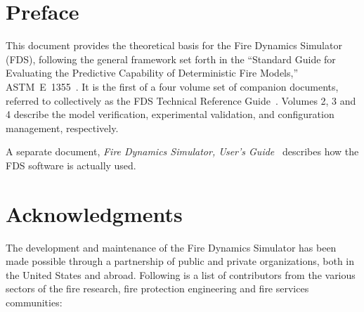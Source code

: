 \documentclass[11pt]{book}
\begin{document}
\newpage





\newpage

\frontmatter

\pagestyle{plain}



\chapter{Preface}

This document provides the theoretical basis for the Fire Dynamics Simulator (FDS), following the general framework set forth in the ``Standard Guide for Evaluating the Predictive Capability of Deterministic Fire Models,'' ASTM~E~1355~\cite{ASTM:E1355}. It is the first of a four volume set of companion documents, referred to collectively as the FDS Technical Reference Guide~\cite{FDS_Tech_Guide}. Volumes 2, 3 and 4 describe the model verification, experimental validation, and configuration management, respectively.

A separate document, {\em Fire Dynamics Simulator, User's Guide}~\cite{FDS_Users_Guide} describes how the FDS software is actually used.




\chapter{Acknowledgments}

\label{acksection}

The development and maintenance of the Fire Dynamics Simulator has been made possible through
a partnership of public and private organizations, both in the United States and abroad. Following
is a list of contributors from the various sectors of the fire research, fire protection engineering and
fire services communities:
\end{document}
